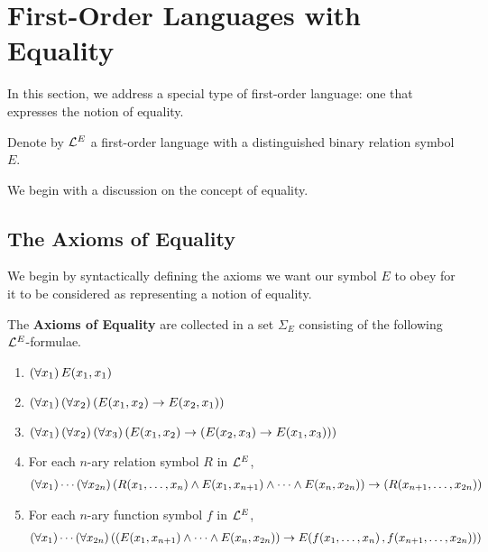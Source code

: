 \section{First-Order Languages with Equality}

In this section, we address a special type of first-order language: one that expresses the notion of equality.

\begin{boxconvention}
    Denote by $\mathcal{L}^{E}$ a first-order language with a distinguished binary relation symbol $E$.
\end{boxconvention}

We begin with a discussion on the concept of equality.

\subsection{The Axioms of Equality}

We begin by syntactically defining the axioms we want our symbol $E$ to obey for it to be considered as representing a notion of equality.

\begin{boxdefinition}\label{Ch2:Def:Eq_Axioms}
    The \textbf{Axioms of Equality} are collected in a set $\Sigma_{E}$ consisting of the following $\mathcal{L}^{E}$-formulae.
    \begin{enumerate}[label = \normalfont (E\arabic*)]
        \item\label{FO:E1} $\left( \forall x_1 \right)E\!\left( x_1, x_1 \right)$
        \item\label{FO:E2} $\left( \forall x_1 \right)\left( \forall x_2 \right)\left( E\!\left( x_1, x_2 \right) \to E\!\left( x_2, x_1 \right) \right)$
        \item\label{FO:E3} $\left( \forall x_1 \right)\left( \forall x_2 \right)\left( \forall x_3 \right)\left( E\!\left( x_1, x_2 \right) \to \left( E\!\left( x_2, x_3 \right) \to E\!\left( x_1, x_3 \right) \right) \right)$
        \item\label{FO:E4} For each $n$-ary relation symbol $R$ in $\mathcal{L}^{E}$,
        \begin{align*}
            \left( \forall x_1 \right)\cdots\left( \forall x_{2n} \right)
            \left( 
                R\!\left( x_1, \ldots, x_n \right) \land
                E\!\left( x_1, x_{n+1} \right) \land
                \cdots \land
                E\!\left( x_n, x_{2n} \right)
             \right) \to \left( 
                R\!\left( x_{n+1}, \ldots, x_{2n} \right)
             \right)
        \end{align*}
        \item\label{FO:E5} For each $n$-ary function symbol $f$ in $\mathcal{L}^{E}$,
        \begin{align*}
            \left( \forall x_1 \right)\cdots\left( \forall x_{2n} \right)
            \left( \left( 
                E\!\left( x_1, x_{n+1} \right) \land
                \cdots \land
                E\!\left( x_n, x_{2n} \right)
             \right) \to E\!\left( 
                f\!\left( x_1, \ldots, x_n \right),
                f\!\left( x_{n+1}, \ldots, x_{2n} \right)
             \right) \right)
        \end{align*}
    \end{enumerate}
\end{boxdefinition}

